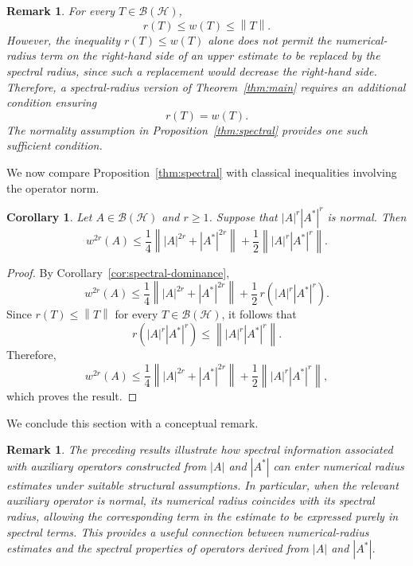 \documentclass[final,1p,times]{elsarticle}
\newtheorem{rem}[thm]{Remark}
\newtheorem{cor}[thm]{Corollary}
\newcommand{\BH}{\mathcal{B}(\mathcal{H})}
\newcommand{\norm}[1]{\left\lVert #1 \right\rVert}
\begin{document}
\medskip



\begin{rem}\label{rem:spectral-numerical}
For every $T\in\BH$,
\[
r(T)\leq w(T)\leq\norm{T}.
\]
However, the inequality $r(T)\leq w(T)$ alone does not permit the
numerical-radius term on the right-hand side of an upper estimate to
be replaced by the spectral radius, since such a replacement would
decrease the right-hand side. Therefore, a spectral-radius version of
Theorem~\ref{thm:main} requires an additional condition ensuring
\[
r(T)=w(T).
\]
The normality assumption in Proposition~\ref{thm:spectral} provides
one such sufficient condition.
\end{rem}
\medskip

We now compare Proposition~\ref{thm:spectral} with classical inequalities involving
the operator norm.

\begin{cor}\label{cor:classical}
Let $A\in\BH$ and $r\geq1$. Suppose that
$|A|^r|A^*|^r$ is normal. Then
\[
w^{2r}(A)
\leq
\frac14\norm{|A|^{2r}+|A^*|^{2r}}
+
\frac12\norm{|A|^r|A^*|^r}.
\]
\end{cor}

\begin{proof}
By Corollary~\ref{cor:spectral-dominance},
\[
w^{2r}(A)
\leq
\frac14\norm{|A|^{2r}+|A^*|^{2r}}
+
\frac12\,r\!\left(|A|^r|A^*|^r\right).
\]
Since $r(T)\leq\norm{T}$ for every $T\in\BH$, it follows that
\[
r\!\left(|A|^r|A^*|^r\right)
\leq
\norm{|A|^r|A^*|^r}.
\]
Therefore,
\[
w^{2r}(A)
\leq
\frac14\norm{|A|^{2r}+|A^*|^{2r}}
+
\frac12\norm{|A|^r|A^*|^r},
\]
which proves the result.
\end{proof}

\medskip

We conclude this section with a conceptual remark.

\begin{rem}
The preceding results illustrate how spectral information associated with
auxiliary operators constructed from $|A|$ and $|A^*|$ can enter numerical
radius estimates under suitable structural assumptions. In particular, when
the relevant auxiliary operator is normal, its numerical radius coincides
with its spectral radius, allowing the corresponding term in the estimate
to be expressed purely in spectral terms. This provides a useful connection
between numerical-radius estimates and the spectral properties of operators
derived from $|A|$ and $|A^*|$.
\end{rem}
\end{document}
